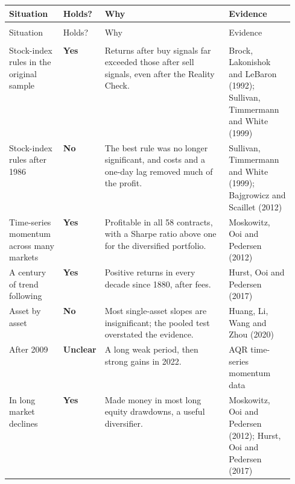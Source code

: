 \begingroup
\small
\setlength{\LTpre}{6pt}\setlength{\LTpost}{6pt}
\begin{longtable}{@{}>{\raggedright\arraybackslash}p{0.19\linewidth}>{\raggedright\arraybackslash}p{0.13\linewidth}>{\raggedright\arraybackslash}p{}>{\raggedright\arraybackslash}p{0.23\linewidth}@{}}
\toprule
Situation & Holds? & Why & Evidence \\
\midrule
\endfirsthead
\multicolumn{4}{@{}l}{\emph{(continued)}} \\
\toprule
Situation & Holds? & Why & Evidence \\
\midrule
\endhead
\midrule
\multicolumn{4}{r@{}}{\emph{(continued on the next page)}} \\
\endfoot
\bottomrule
\endlastfoot
Stock-index rules in the original sample & \textbf{Yes} & Returns after buy signals far exceeded those after sell signals, even after the Reality Check. & Brock, Lakonishok and LeBaron (1992); Sullivan, Timmermann and White (1999) \\*
\addlinespace[3pt]
Stock-index rules after 1986 & \textbf{No} & The best rule was no longer significant, and costs and a one-day lag removed much of the profit. & Sullivan, Timmermann and White (1999); Bajgrowicz and Scaillet (2012) \\
\addlinespace[3pt]
Time-series momentum across many markets & \textbf{Yes} & Profitable in all 58 contracts, with a Sharpe ratio above one for the diversified portfolio. & Moskowitz, Ooi and Pedersen (2012) \\
\addlinespace[3pt]
A century of trend following & \textbf{Yes} & Positive returns in every decade since 1880, after fees. & Hurst, Ooi and Pedersen (2017) \\
\addlinespace[3pt]
Asset by asset & \textbf{No} & Most single-asset slopes are insignificant; the pooled test overstated the evidence. & Huang, Li, Wang and Zhou (2020) \\
\addlinespace[3pt]
After 2009 & \textbf{Unclear} & A long weak period, then strong gains in 2022. & AQR time-series momentum data \\*
\addlinespace[3pt]
In long market declines & \textbf{Yes} & Made money in most long equity drawdowns, a useful diversifier. & Moskowitz, Ooi and Pedersen (2012); Hurst, Ooi and Pedersen (2017) \\
\end{longtable}
\addtocounter{table}{-1}%
\endgroup

